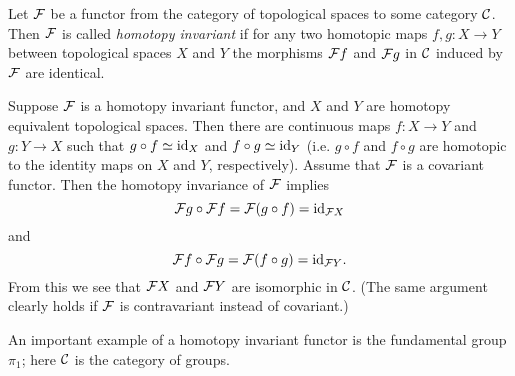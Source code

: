 \documentclass[12pt]{article}
\begin{document}
Let $\cal F$ be a functor from the category of topological spaces to some category $\cal C$.  Then $\cal F$ is called {\em homotopy invariant} if for any two homotopic maps $f,g\colon X\to Y$ between topological spaces $X$ and $Y$ the morphisms ${\cal F}f$ and ${\cal F}g$ in $\cal C$ induced by $\cal F$ are identical.

Suppose $\cal F$ is a homotopy invariant functor, and $X$ and $Y$ are homotopy equivalent topological spaces.  Then there are continuous maps $f\colon X\to Y$ and $g\colon Y\to X$ such that $g\circ f\simeq{\rm id}_X$ and $f\circ g\simeq{\rm id}_Y$ (i.e. $g\circ f$ and $f\circ g$ are homotopic to the identity maps on $X$ and $Y$, respectively).  Assume that $\cal F$ is a covariant functor.  Then the homotopy invariance of $\cal F$ implies
$$
{\cal F}g\circ{\cal F}f={\cal F}(g\circ f)={\rm id}_{{\cal F}X}
$$
and
$$
{\cal F}f\circ{\cal F}g={\cal F}(f\circ g)={\rm id}_{{\cal F}Y}.
$$
From this we see that ${\cal F}X$ and ${\cal F}Y$ are isomorphic in $\cal C$.  (The same argument clearly holds if $\cal F$ is contravariant instead of covariant.)

An important example of a homotopy invariant functor is the fundamental group $\pi_1$; here $\cal C$ is the category of groups.
\end{document}
